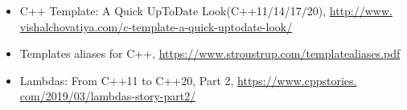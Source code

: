 \begin{itemize}
\item
C++ Template: A Quick UpToDate Look(C++11/14/17/20), \url{http://www.
vishalchovatiya.com/c-template-a-quick-uptodate-look/}

\item
Templates aliases for C++, \url{https://www.stroustrup.com/templatealiases.pdf}

\item
Lambdas: From C++11 to C++20, Part 2, \url{https://www.cppstories.
com/2019/03/lambdas-story-part2/}
\end{itemize}